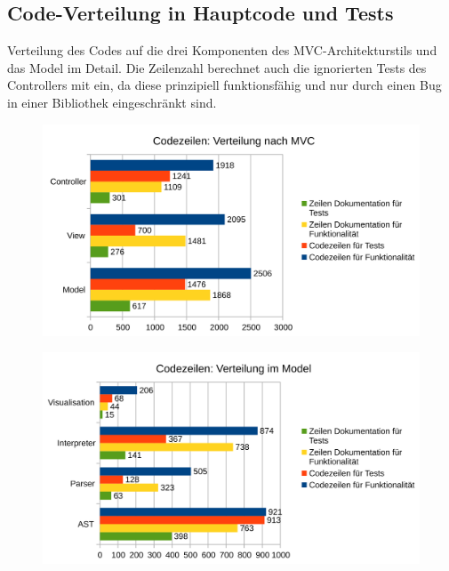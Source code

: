 \documentclass[parskip=full,11pt,twoside]{scrartcl}
\begin{document}
\subsection{Code-Verteilung in Hauptcode und Tests}
Verteilung des Codes auf die drei Komponenten des MVC-Architekturstils und das Model im Detail. Die Zeilenzahl berechnet auch die ignorierten Tests des Controllers mit ein, da diese prinzipiell funktionsfähig und nur durch einen Bug in einer Bibliothek eingeschränkt sind.

\begin{figure}[!h]
	\centering
	\includegraphics[width=\linewidth]{images/loc_mvc.png}
\end{figure}

\begin{figure}[!h]
	\centering
	\includegraphics[width=\linewidth]{images/loc_model.png}
\end{figure}
\end{document}
